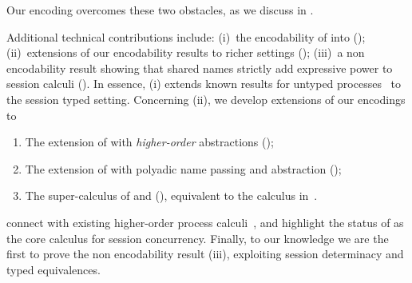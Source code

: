 \documentclass[runningheads]{llncs}
\begin{document}
{%

Our encoding overcomes these two obstacles, as we discuss in .

Additional technical contributions include: 
(i)~the encodability of \HO into \sessp (); 
(ii)~extensions of our encodability results to richer settings ();
(iii)~a non encodability result showing that shared names strictly add expressive power to session calculi ().
In essence, (i) extends known  results for untyped processes~\cite{SangiorgiD:expmpa} to the session typed setting.
Concerning (ii), we develop extensions of our encodings to 
\begin{enumerate}[-]
\item The extension of \HOp with \emph{higher-order} abstractions (\HOpp); 
\item The extension of \HOp with polyadic name passing and abstraction (\PHOp); 
\item The super-calculus of \HOpp and \PHOp (\PHOpp), equivalent to the calculus in~\cite{tlca07}.
\end{enumerate}

connect \HOp with existing higher-order process calculi~\cite{tlca07}, and  
 highlight the status of \HO as the core calculus for session concurrency.
Finally, %
to our knowledge we are the first to prove 
the non encodability result (iii),
exploiting session determinacy and typed equivalences.




}
\end{document}
